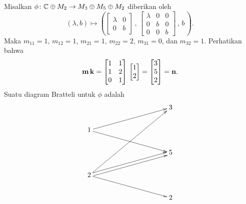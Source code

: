 \begin{exam} Misalkan $\phi\colon \mathbb{C} \oplus M_2 \rightarrow M_3 \oplus M_5 \oplus M_2$
diberikan oleh
 \[ (\lambda, b) \mapsto \left(
    \begin{bmatrix}
        \lambda & 0  \\
            0 &  b
      \end{bmatrix}\, , \,
      \begin{bmatrix}
        \lambda & 0 & 0  \\
              0 & b & 0  \\
              0 & 0 &  b
      \end{bmatrix} \,,\, b \, \right).
    \]
Maka $m_{11} = 1$, $m_{12} = 1$, $m_{21} = 1$, $m_{22} = 2$, $m_{31} = 0$, dan $m_{32} = 1$.
Perhatikan bahwa
 \[\mathbf{m} \,\mathbf{k} = \begin{bmatrix} 1 & 1 \\ 1 & 2 \\ 0 & 1 \end{bmatrix}\,
             \begin{bmatrix} 1 \\ 2 \end{bmatrix} =
             \begin{bmatrix} 3 \\ 5 \\2 \end{bmatrix} = \mathbf{n}.\]
Suatu diagram Bratteli untuk $\phi$ adalah
 \[\xymatrix@=20pt@C+30pt{&& 3                    \\
                   1 \ar[urr]\ar[drr] &&   \\
                   && 5                    \\
         2\ar[uuurr]\ar@<+.5ex>[urr]\ar@<-.5ex>[urr]\ar[drr] && \\
                   && 2
   }\]
\end{exam}

